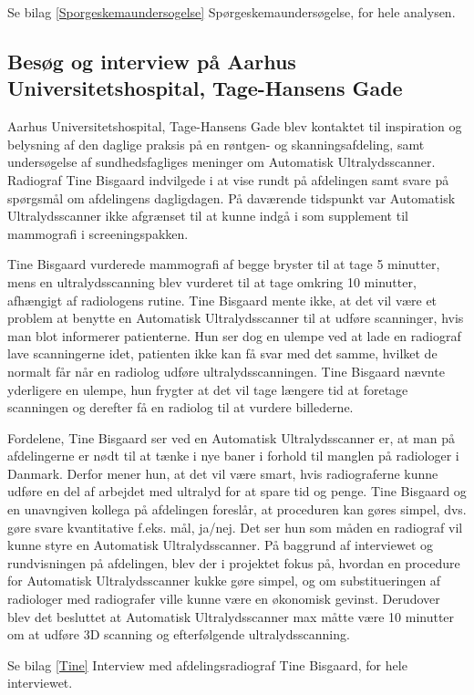 Se bilag \ref{Sporgeskemaundersogelse} Spørgeskemaundersøgelse, for hele analysen. 

\subsection{Besøg og interview på Aarhus Universitetshospital, Tage-Hansens Gade} 
Aarhus Universitetshospital, Tage-Hansens Gade blev kontaktet til inspiration og belysning af den daglige praksis på en røntgen- og skanningsafdeling, samt undersøgelse af sundhedsfagliges meninger om Automatisk Ultralydsscanner. Radiograf Tine Bisgaard indvilgede i at vise rundt på afdelingen samt svare på spørgsmål om afdelingens dagligdagen. På daværende tidspunkt var Automatisk Ultralydsscanner ikke afgrænset til at kunne indgå i som supplement til mammografi i screeningspakken. 

Tine Bisgaard vurderede mammografi af begge bryster til at tage 5 minutter, mens en ultralydsscanning blev vurderet til at tage omkring 10 minutter, afhængigt af radiologens rutine. Tine Bisgaard mente ikke, at det vil være et problem at benytte en Automatisk Ultralydsscanner til at udføre scanninger, hvis man blot informerer patienterne. Hun ser dog en ulempe ved at lade en radiograf lave scanningerne idet, patienten ikke kan få svar med det samme, hvilket de normalt får når en radiolog udføre ultralydsscanningen. Tine Bisgaard nævnte yderligere en ulempe, hun frygter at det vil tage længere tid at foretage scanningen og derefter få en radiolog til at vurdere billederne.

Fordelene, Tine Bisgaard ser ved en Automatisk Ultralydsscanner er, at man på afdelingerne er nødt til at tænke i nye baner i forhold til manglen på radiologer i Danmark. Derfor mener hun, at det vil være smart, hvis radiograferne kunne udføre en del af arbejdet med ultralyd for at spare tid og penge. Tine Bisgaard og en unavngiven kollega på afdelingen foreslår, at proceduren kan gøres simpel, dvs. gøre svare kvantitative f.eks. mål, ja/nej. Det ser hun som måden en radiograf vil kunne styre en Automatisk Ultralydsscanner. På baggrund af interviewet og rundvisningen på afdelingen, blev der i projektet fokus på, hvordan en procedure for Automatisk Ultralydsscanner kukke gøre simpel, og om substitueringen af radiologer med radiografer ville kunne være en økonomisk gevinst. Derudover blev det besluttet at Automatisk Ultralydsscanner max måtte være 10 minutter om at udføre 3D scanning og efterfølgende ultralydsscanning. 

Se bilag \ref{Tine} Interview med afdelingsradiograf Tine Bisgaard, for hele interviewet. 

